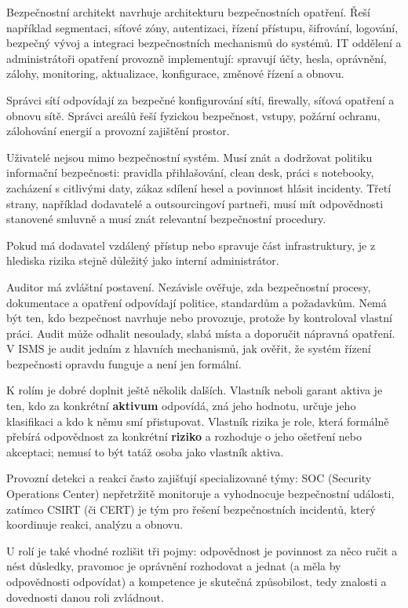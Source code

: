 \documentclass[11pt,a4paper]{article}
\begin{document}
Bezpečnostní architekt navrhuje architekturu bezpečnostních opatření. Řeší například segmentaci, síťové zóny, autentizaci, řízení přístupu, šifrování, logování, bezpečný vývoj a integraci bezpečnostních mechanismů do systémů. IT oddělení a administrátoři opatření provozně implementují: spravují účty, hesla, oprávnění, zálohy, monitoring, aktualizace, konfigurace, změnové řízení a obnovu.

Správci sítí odpovídají za bezpečné konfigurování sítí, firewally, síťová opatření a obnovu sítě. Správci areálů řeší fyzickou bezpečnost, vstupy, požární ochranu, zálohování energií a provozní zajištění prostor.

Uživatelé nejsou mimo bezpečnostní systém. Musí znát a dodržovat politiku informační bezpečnosti: pravidla přihlašování, clean desk, práci s notebooky, zacházení s citlivými daty, zákaz sdílení hesel a povinnost hlásit incidenty. Třetí strany, například dodavatelé a outsourcingoví partneři, musí mít odpovědnosti stanovené smluvně a musí znát relevantní bezpečnostní procedury.

Pokud má dodavatel vzdálený přístup nebo spravuje část infrastruktury, je z hlediska rizika stejně důležitý jako interní administrátor.

Auditor má zvláštní postavení. Nezávisle ověřuje, zda bezpečnostní procesy, dokumentace a opatření odpovídají politice, standardům a požadavkům. Nemá být ten, kdo bezpečnost navrhuje nebo provozuje, protože by kontroloval vlastní práci. Audit může odhalit nesoulady, slabá místa a doporučit nápravná opatření. V ISMS je audit jedním z hlavních mechanismů, jak ověřit, že systém řízení bezpečnosti opravdu funguje a není jen formální.

K rolím je dobré doplnit ještě několik dalších. Vlastník neboli garant aktiva je ten, kdo za konkrétní \textbf{aktivum} odpovídá, zná jeho hodnotu, určuje jeho klasifikaci a kdo k němu smí přistupovat. Vlastník rizika je role, která formálně přebírá odpovědnost za konkrétní \textbf{riziko} a rozhoduje o jeho ošetření nebo akceptaci; nemusí to být tatáž osoba jako vlastník aktiva.

Provozní detekci a reakci často zajišťují specializované týmy: SOC (Security Operations Center) nepřetržitě monitoruje a vyhodnocuje bezpečnostní události, zatímco CSIRT (či CERT) je tým pro řešení bezpečnostních incidentů, který koordinuje reakci, analýzu a obnovu.

U rolí je také vhodné rozlišit tři pojmy: odpovědnost je povinnost za něco ručit a nést důsledky, pravomoc je oprávnění rozhodovat a jednat (a měla by odpovědnosti odpovídat) a kompetence je skutečná způsobilost, tedy znalosti a dovednosti danou roli zvládnout.
\end{document}
